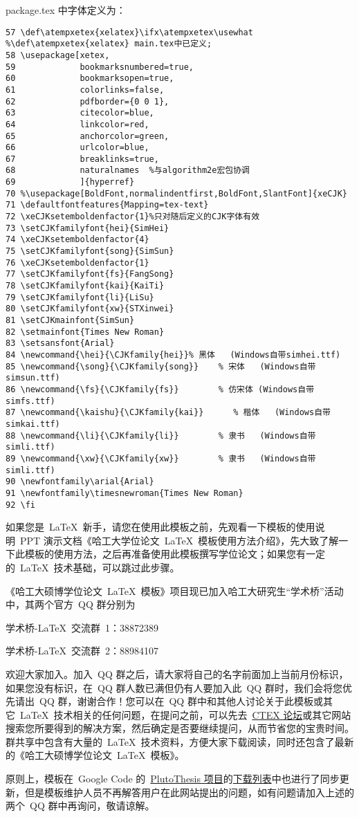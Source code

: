 package.tex 中字体定义为：
\begin{verbatim}
57 \def\atempxetex{xelatex}\ifx\atempxetex\usewhat %\def\atempxetex{xelatex} main.tex中已定义;
58 \usepackage[xetex,
59             bookmarksnumbered=true,
60             bookmarksopen=true,
61             colorlinks=false,
62             pdfborder={0 0 1},
63             citecolor=blue,
64             linkcolor=red,
65             anchorcolor=green,
66             urlcolor=blue,
67             breaklinks=true,
68             naturalnames  %与algorithm2e宏包协调
69             ]{hyperref}
70 %\usepackage[BoldFont,normalindentfirst,BoldFont,SlantFont]{xeCJK}
71 \defaultfontfeatures{Mapping=tex-text}
72 \xeCJKsetemboldenfactor{1}%只对随后定义的CJK字体有效
73 \setCJKfamilyfont{hei}{SimHei}
74 \xeCJKsetemboldenfactor{4}
75 \setCJKfamilyfont{song}{SimSun}
76 \xeCJKsetemboldenfactor{1}
77 \setCJKfamilyfont{fs}{FangSong}
78 \setCJKfamilyfont{kai}{KaiTi}
79 \setCJKfamilyfont{li}{LiSu}
80 \setCJKfamilyfont{xw}{STXinwei}
81 \setCJKmainfont{SimSun}
82 \setmainfont{Times New Roman}
83 \setsansfont{Arial}
84 \newcommand{\hei}{\CJKfamily{hei}}% 黑体   (Windows自带simhei.ttf)
85 \newcommand{\song}{\CJKfamily{song}}    % 宋体   (Windows自带simsun.ttf)
86 \newcommand{\fs}{\CJKfamily{fs}}        % 仿宋体 (Windows自带simfs.ttf)
87 \newcommand{\kaishu}{\CJKfamily{kai}}      % 楷体   (Windows自带simkai.ttf)
88 \newcommand{\li}{\CJKfamily{li}}        % 隶书   (Windows自带simli.ttf)
89 \newcommand{\xw}{\CJKfamily{xw}}        % 隶书   (Windows自带simli.ttf)
90 \newfontfamily\arial{Arial}                                                                                                                                               
91 \newfontfamily\timesnewroman{Times New Roman}
92 \fi
\end{verbatim}


如果您是~\LaTeX~新手，请您在使用此模板之前，先观看一下模板的使用说明~PPT 演示文档《哈工大学位论文~\LaTeX~模板使用方法介绍》，先大致了解一下此模板的使用方法，之后再准备使用此模板撰写学位论文；如果您有一定的~\LaTeX~技术基础，可以跳过此步骤。

《哈工大硕博学位论文~\LaTeX~模板》项目现已加入哈工大研究生“学术桥”活动中，其两个官方~QQ 群分别为

\centerline{学术桥-\LaTeX~交流群~1：38872389}
\centerline{学术桥-\LaTeX~交流群~2：88984107}
\noindent 欢迎大家加入。加入~QQ 群之后，请大家将自己的名字前面加上当前月份标识，如果您没有标识，在~QQ 群人数已满但仍有人要加入此~QQ 群时，我们会将您优先请出~QQ 群，谢谢合作！您可以在~QQ 群中和其他人讨论关于此模板或其它~\LaTeX~技术相关的任何问题，在提问之前，可以先去~\href{http://bbs.ctex.org/}{CTEX 论坛}或其它网站搜索您所要得到的解决方案，然后确定是否要继续提问，从而节省您的宝贵时间。群共享中包含有大量的~\LaTeX~技术资料，方便大家下载阅读，同时还包含了最新的《哈工大硕博学位论文~\LaTeX~模板》。

原则上，模板在~Google Code 的~\href{http://code.google.com/p/plutothesis/}{PlutoThesis 项目}的\href{http://code.google.com/p/plutothesis/downloads/list}{下载列表}中也进行了同步更新，但是模板维护人员不再解答用户在此网站提出的问题，如有问题请加入上述的两个~QQ 群中再询问，敬请谅解。
